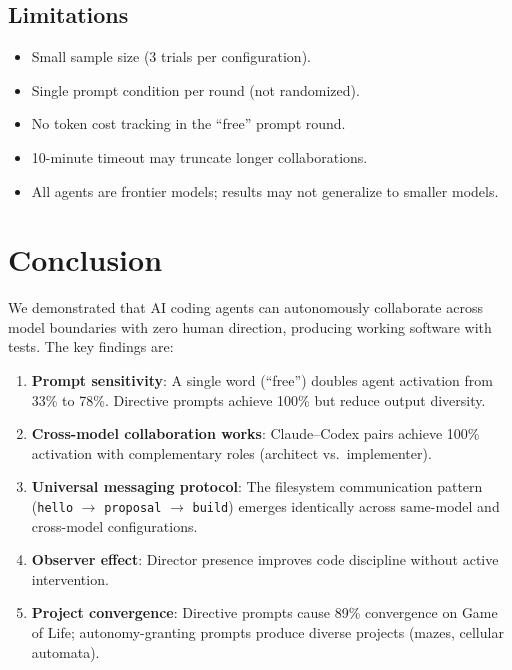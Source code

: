 \documentclass[11pt,a4paper]{article}
\begin{document}
\subsection{Limitations}

\begin{itemize}
  \item Small sample size (3 trials per configuration).
  \item Single prompt condition per round (not randomized).
  \item No token cost tracking in the ``free'' prompt round.
  \item 10-minute timeout may truncate longer collaborations.
  \item All agents are frontier models; results may not generalize to smaller models.
\end{itemize}

\section{Conclusion}

We demonstrated that AI coding agents can autonomously collaborate across model boundaries
with zero human direction, producing working software with tests. The key findings are:

\begin{enumerate}
  \item \textbf{Prompt sensitivity}: A single word (``free'') doubles agent activation
    from 33\% to 78\%. Directive prompts achieve 100\% but reduce output diversity.
  \item \textbf{Cross-model collaboration works}: Claude--Codex pairs achieve 100\%
    activation with complementary roles (architect vs.\ implementer).
  \item \textbf{Universal messaging protocol}: The filesystem communication pattern
    (\texttt{hello} $\to$ \texttt{proposal} $\to$ \texttt{build}) emerges identically
    across same-model and cross-model configurations.
  \item \textbf{Observer effect}: Director presence improves code discipline without
    active intervention.
  \item \textbf{Project convergence}: Directive prompts cause 89\% convergence on Game
    of Life; autonomy-granting prompts produce diverse projects (mazes, cellular automata).
\end{enumerate}
\end{document}
